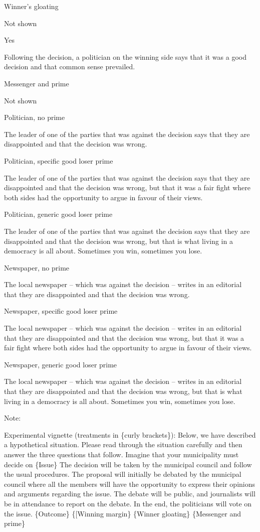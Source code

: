 \documentclass[
]{book}
\begin{document}
Winner's gloating

Not shown

Yes

Following the decision, a politician on the winning side says that it
was a good decision and that common sense prevailed.

Messenger and prime

Not shown

Politician, no prime

The leader of one of the parties that was against the decision says that
they are disappointed and that the decision was wrong.

Politician, specific good loser prime

The leader of one of the parties that was against the decision says that
they are disappointed and that the decision was wrong, but that it was a
fair fight where both sides had the opportunity to argue in favour of
their views.

Politician, generic good loser prime

The leader of one of the parties that was against the decision says that
they are disappointed and that the decision was wrong, but that is what
living in a democracy is all about. Sometimes you win, sometimes you
lose.

Newspaper, no prime

The local newspaper -- which was against the decision -- writes in an
editorial that they are disappointed and that the decision was wrong.

Newspaper, specific good loser prime

The local newspaper -- which was against the decision -- writes in an
editorial that they are disappointed and that the decision was wrong,
but that it was a fair fight where both sides had the opportunity to
argue in favour of their views.

Newspaper, generic good loser prime

The local newspaper -- which was against the decision -- writes in an
editorial that they are disappointed and that the decision was wrong,
but that is what living in a democracy is all about. Sometimes you win,
sometimes you lose.

{Note: }

Experimental vignette (treatments in \{curly brackets\}): Below, we have
described a hypothetical situation. Please read through the situation
carefully and then answer the three questions that follow. Imagine that
your municipality must decide on \{Issue\} The decision will be taken by
the municipal council and follow the usual procedures. The proposal will
initially be debated by the municipal council where all the members will
have the opportunity to express their opinions and arguments regarding
the issue. The debate will be public, and journalists will be in
attendance to report on the debate. In the end, the politicians will
vote on the issue. \{Outcome\} \{{[}Winning margin\} \{Winner gloating\}
\{Messenger and prime\}
\end{document}
